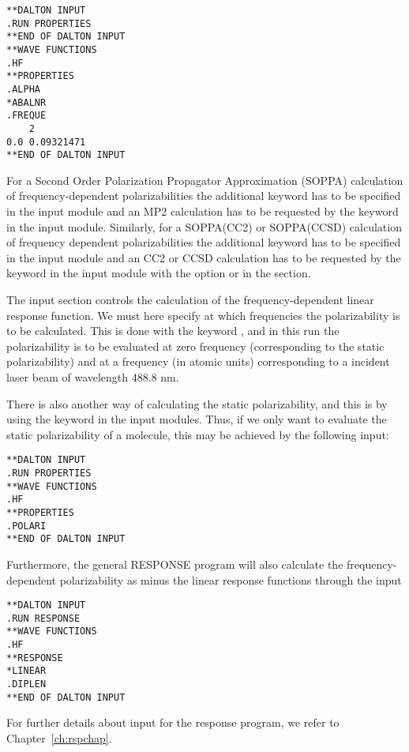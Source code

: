 \begin{verbatim}
**DALTON INPUT
.RUN PROPERTIES
**END OF DALTON INPUT
**WAVE FUNCTIONS
.HF
**PROPERTIES
.ALPHA
*ABALNR
.FREQUE
    2
0.0 0.09321471
**END OF DALTON INPUT
\end{verbatim}

For a Second Order Polarization Propagator Approximation
(SOPPA)
\cite{esnpjjodjcp73,jopjdycpr2,mjpekdtehjajjojcp,ekdspasjpca102}
calculation of frequency-dependent polarizabilities the additional
keyword  has to be specified in the  input
module and an MP2 calculation has to be requested by the keyword
 in the  input module. Similarly, for a
SOPPA(CC2)  \cite{spas097}
 or SOPPA(CCSD) \cite{soppaccsd,ekdspasjpca102}
calculation of frequency dependent polarizabilities the additional
keyword  has to be specified in the 
input module and an CC2 or CCSD calculation has to be requested by the
keyword  in the  input module with the
option  or  in the  section.

The  input section controls the calculation of the
frequency-dependent linear response
function.
We must here specify at which frequencies the polarizability is
to be calculated. This is done with the keyword , and in
this run the polarizability is to be evaluated at zero frequency
(corresponding to the static polarizability) and at a frequency (in
atomic units) corresponding to a incident laser beam of wavelength
488.8 nm.

There is also another way of calculating the static
 polarizability, and this is by using the
keyword  in the  input modules. Thus, if we only
want to evaluate the static polarizability of a molecule, this may be
achieved by the following input:

\begin{verbatim}
**DALTON INPUT
.RUN PROPERTIES
**WAVE FUNCTIONS
.HF
**PROPERTIES
.POLARI
**END OF DALTON INPUT
\end{verbatim}

Furthermore, the general RESPONSE program will also calculate the
frequency-dependent polarizability
as minus the linear response functions through the input


\begin{verbatim}
**DALTON INPUT
.RUN RESPONSE
**WAVE FUNCTIONS
.HF
**RESPONSE
*LINEAR
.DIPLEN
**END OF DALTON INPUT
\end{verbatim}
For further details about input for the response program, we refer
to Chapter~\ref{ch:rspchap}.
